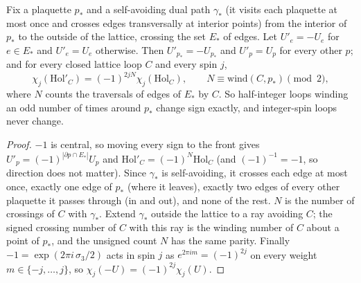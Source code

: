 \begin{theorem}\label{p2thm:vortex}
 Fix a plaquette $p_*$ and a self-avoiding dual path $\gamma_*$ (it visits each plaquette at most once
and crosses edges transversally at interior points) from the interior of $p_*$ to the outside of the lattice, crossing
the set $E_*$ of edges. Let $U'_e=-U_e$ for $e\in E_*$ and $U'_e=U_e$ otherwise. Then
$U'_{p_*}=-U_{p_*}$ and $U'_p=U_p$ for every other $p$; and for every closed lattice loop $C$ and every spin $j$,
\[
\chi_j(\mathrm{Hol}'_C)=(-1)^{2jN}\chi_j(\mathrm{Hol}_C),\qquad N\equiv\mathrm{wind}(C,p_*)\pmod 2,
\]
where $N$ counts the traversals of edges of $E_*$ by $C$. So half-integer loops winding an odd number of times around
$p_*$ change sign exactly, and integer-spin loops never change.
\end{theorem}
\begin{proof}
$-1$ is central, so moving every sign to the front gives $U'_p=(-1)^{|\partial p\cap E_*|}U_p$ and
$\mathrm{Hol}'_C=(-1)^N\mathrm{Hol}_C$ (and $(-1)^{-1}=-1$, so direction does not matter). Since $\gamma_*$ is
self-avoiding, it crosses each edge at most once, exactly one edge of $p_*$ (where it leaves), exactly two edges of every
other plaquette it passes through (in and out), and none of the rest. $N$ is the number of crossings of $C$ with
$\gamma_*$. Extend $\gamma_*$ outside the lattice to a ray avoiding $C$; the signed crossing number of $C$ with this ray
is the winding number of $C$ about a point of $p_*$, and the unsigned count $N$ has the same parity. Finally $-1=\exp(2\pi i\,\sigma_3/2)$ acts in spin $j$ as $e^{2\pi i m}=(-1)^{2j}$ on
every weight $m\in\{-j,\dots,j\}$, so $\chi_j(-U)=(-1)^{2j}\chi_j(U)$.
\end{proof}


